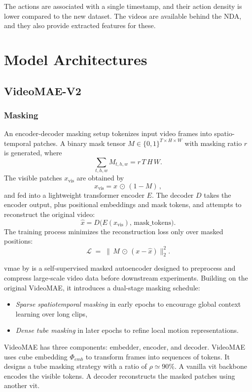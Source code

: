 The actions are associated with a single timestamp, and their action density is lower compared to the new dataset. The videos are available behind the NDA, and they also provide extracted features for these. 

\section{Model Architectures}
\label{sec:model_architectures}

\subsection{VideoMAE-V2}
\label{ssec:videomae_v2}

\subsubsection{Masking}

An encoder-decoder masking setup tokenizes input video frames into spatio-temporal patches. A binary mask tensor \(M\in\{0,1\}^{T\times H\times W}\) with masking ratio \(r\) is generated, where
\[
\sum_{t,h,w} M_{t,h,w} = r\,T\,H\,W.
\]
The visible patches \(x_\text{vis}\) are obtained by
\[
x_\text{vis} = x \,\odot\,(1 - M)\,,
\]
and fed into a lightweight transformer encoder \(E\). The decoder \(D\) takes the encoder output, plus positional embeddings and mask tokens, and attempts to reconstruct the original video:
\[
\hat{x} = D\bigl(E(x_\text{vis}),\,\text{mask\_tokens}\bigr).
\]
The training process minimizes the reconstruction loss only over masked positions:
\[
\mathcal{L} \;=\; \bigl\lVert\,M \,\odot\,(x - \hat{x})\bigr\rVert_2^2.
\]


\acrfull{vmae} by \textcite{wang_videomae_2023} is a self‑supervised masked autoencoder designed to preprocess and compress large‑scale video data before downstream experiments. Building on the original VideoMAE\cite{tong_videomae_2022}, it introduces a dual‑stage masking schedule: 

\begin{itemize}
    \item \emph{Sparse spatiotemporal masking} in early epochs to encourage global context learning over long clips,
    \item \emph{Dense tube masking} in later epochs to refine local motion representations.
\end{itemize}

VideoMAE has three components: embedder, encoder, and decoder. VideoMAE uses cube embedding \(\Phi_{emb}\) to transform frames into sequences of tokens. It designs a tube masking strategy with a ratio of \(\rho \simeq 90\%\). A vanilla \acrshort{vit} backbone encodes the visible tokens. A decoder reconstructs the masked patches using another \acrshort{vit}\cite{wang_videomae_2023}. 


